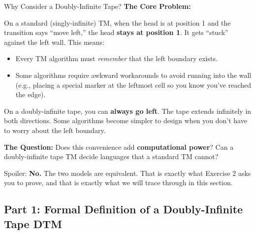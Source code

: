 \begin{conceptbox}{Why Consider a Doubly-Infinite Tape?}
\textbf{The Core Problem:}

On a standard (singly-infinite) TM, when the head is at position 1 and the
transition says ``move left,'' the head \textbf{stays at position 1}. It gets
``stuck'' against the left wall. This means:
\begin{itemize}[nosep]
\item Every TM algorithm must \emph{remember} that the left boundary exists.
\item Some algorithms require awkward workarounds to avoid running into the
  wall (e.g., placing a special marker at the leftmost cell so you know
  you've reached the edge).
\end{itemize}

On a doubly-infinite tape, you can \textbf{always go left}. The tape extends
infinitely in both directions. Some algorithms become simpler to design when
you don't have to worry about the left boundary.

\textbf{The Question:} Does this convenience add \textbf{computational power}?
Can a doubly-infinite tape TM decide languages that a standard TM cannot?

Spoiler: \textbf{No.} The two models are equivalent. That is exactly what
Exercise 2 asks you to prove, and that is exactly what we will trace through
in this section.

\end{conceptbox}

\subsection{Part 1: Formal Definition of a Doubly-Infinite Tape DTM}
\label{subsec:doubly-infinite-formal}

